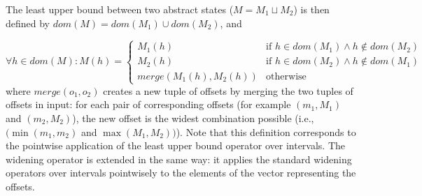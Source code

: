 The least upper bound between two abstract states ($M=M_1 \sqcup M_2$) is then defined by $dom(M) = dom(M_1) \cup dom(M_2)$, and

$$
\forall h \in dom(M) : M(h) = \begin{cases}
M_1(h) & \mbox{if } h \in dom(M_1) \wedge h \notin dom(M_2) \\
M_2(h) & \mbox{if } h \in dom(M_2) \wedge h \notin dom(M_1) \\
merge(M_1(h),M_2(h)) & \mbox{otherwise }
\end{cases}$$
where $merge(o_1,o_2)$ creates a new tuple of offsets by merging the two tuples of offsets in input: for each pair of corresponding offsets (for example $(m_1,M_1)$ and $(m_2,M_2)$), the new offset is the widest combination possible (i.e., $(\min(m_1,m_2)$ and $\max(M_1,M_2))$). Note that this definition corresponds to the pointwise application of the least upper bound operator over intervals. The widening operator is extended in the same way: it applies the standard widening operators over intervals pointwisely to the elements of the vector representing the offsets.
